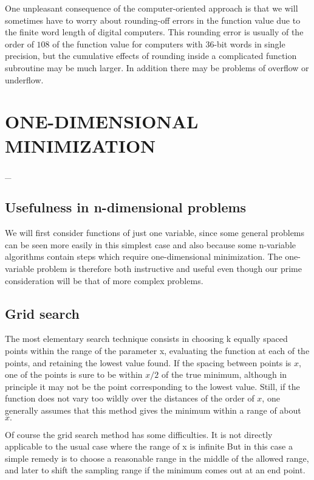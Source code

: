      One unpleasant consequence of the computer-oriented approach is that
we will sometimes have to worry about rounding-off errors in the
function value due to the finite word length of digital
computers.  This rounding
error is usually of the order
of $10 8$ of the function value for computers
with 36-bit words in single precision, but the cumulative effects of
rounding inside a complicated function subroutine may be much larger.
In addition there may be problems of overflow or underflow.
 
 
\chapter{ONE-DIMENSIONAL MINIMIZATION}
_
 
\section{Usefulness in n-dimensional problems}
     We will first consider functions of just one variable, since some
general problems can be seen more easily in this simplest case and also
because some n-variable algorithms contain steps which require
one-dimensional minimization.  The one-variable problem is therefore both
instructive and useful even though our prime consideration will be that
of more complex problems.
 
 
\section{Grid search}
 
     The most elementary search technique consists in choosing k equally
spaced points within the range of the parameter x, evaluating the
function at each of the points, and retaining the lowest value found. If
the spacing between points is $x$, one of the points is sure to be
within
$x/2$ of the true minimum, although in principle it may not be the point
corresponding to the lowest value.  Still, if the function does not vary
too wildly over the distances of the order of $x$, one generally assumes
that this method gives the minimum within a range of about $x.$
 
     Of course the grid search method has some difficulties. It is not
directly applicable to the usual case where the range of x is infinite
But in this case a simple remedy is to choose a reasonable range in the
middle of the allowed range, and later to shift the sampling range if the
minimum comes out at an end point.
 
